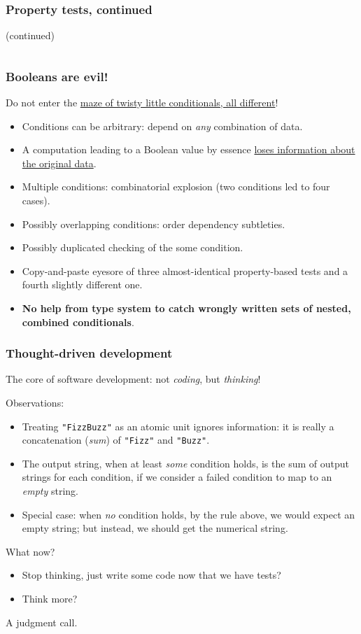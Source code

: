 \begin{frame}[fragile]
  \frametitle{Property tests, continued}

  (continued)
  \inputminted{scala}{FizzBuzzSpec3.scala}
\end{frame}

\begin{frame}
  \frametitle{Booleans are evil!}

  Do not enter the \href{http://en.wikiquote.org/wiki/Colossal\_Cave\_Adventure}{maze of twisty little conditionals, all different}!
  \begin{itemize}
  \item Conditions can be arbitrary: depend on \emph{any} combination of data.
  \item A computation leading to a Boolean value by essence \href{http://existentialtype.wordpress.com/2011/03/15/boolean-blindness/}{loses information about the original data}.
  \item Multiple conditions: combinatorial explosion (two conditions led to four cases).
  \item Possibly overlapping conditions: order dependency subtleties.
  \item Possibly duplicated checking of the some condition.
  \item Copy-and-paste eyesore of three almost-identical property-based tests and a fourth slightly different one.
  \item \textbf{No help from type system to catch wrongly written sets of nested, combined conditionals}.
  \end{itemize}

\end{frame}

\begin{frame}
  \frametitle{Thought-driven development}

  The core of software development: not \emph{coding}, but \emph{thinking}!

  Observations:
  \begin{itemize}
  \item Treating \texttt{"FizzBuzz"} as an atomic unit ignores information: it is really a concatenation (\emph{sum}) of \texttt{"Fizz"} and \texttt{"Buzz"}.
  \item The output string, when at least \emph{some} condition holds, is the sum of output strings for each condition, if we consider a failed condition to map to an \emph{empty} string.
  \item Special case: when \emph{no} condition holds, by the rule above, we would expect an empty string; but instead, we should get the numerical string.
  \end{itemize}

  What now?
  \begin{itemize}
  \item Stop thinking, just write some code now that we have tests?
  \item Think more?
  \end{itemize}

  A judgment call.
\end{frame}


